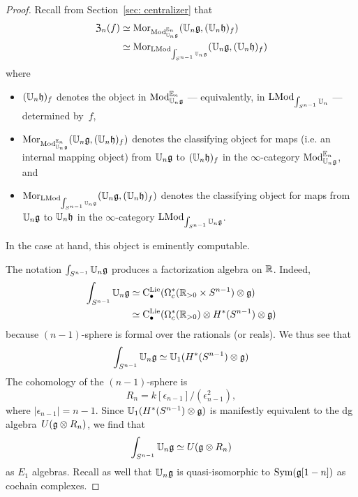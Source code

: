 \documentclass[11pt]{amsart}
\numberwithin{equation}{section}
\begin{document}
\begin{proof}
Recall from Section~\ref{sec: centralizer} that 
\begin{align*}
{\frak Z}_n(f) &\simeq {{\rm Mor}}_{{\rm Mod}^{\mathbb E_n}_{\mathbb U_n\mathfrak g}}(\mathbb U_n \mathfrak g, (\mathbb U_n \mathfrak h)_f) \\
&\simeq {\rm Mor}_{{\rm LMod}_{\int_{S^{n-1}} \mathbb U_n\mathfrak g}}(\mathbb U_n \mathfrak g, (\mathbb U_n \mathfrak h)_f)
\end{align*}
where 
\begin{itemize}
\item $(\mathbb U_n \mathfrak h)_f$ denotes the object in ${\rm Mod}^{\mathbb E_n}_{\mathbb U_n\mathfrak g}$ --- equivalently, in ${\rm LMod}_{\int_{S^{n-1}}\mathbb U_n}$ --- determined by~$f$, 
\item ${\rm Mor}_{{\rm Mod}^{\mathbb E_n}_{\mathbb U_n\mathfrak g}}(\mathbb U_n \mathfrak g, (\mathbb U_n \mathfrak h)_f)$ denotes the classifying object for maps (i.e. an internal mapping object) from $\mathbb U_n\mathfrak g$ to $(\mathbb U_n \mathfrak h)_f$ in the $\infty$-category ${\rm Mod}^{\mathbb E_n}_{\mathbb U_n\mathfrak g}$, and
\item ${\rm Mor}_{{\rm LMod}_{\int_{S^{n-1}} \mathbb U_n\mathfrak g}} (\mathbb U_n \mathfrak g, (\mathbb U_n \mathfrak h)_f)$ denotes the classifying object for maps from ${\mathbb U_n\mathfrak g}$ to $\mathbb U_n \mathfrak h$ in the $\infty$-category ${\rm LMod}_{\int_{S^{n-1}}\mathbb U_n\mathfrak g}$. 
\end{itemize}
In the case at hand, this object is eminently computable.

The notation $\int_{S^{n-1}}\mathbb U_n\mathfrak g$ produces a factorization algebra on $\mathbb R$.
Indeed,
\begin{align*}
\int_{S^{n-1}}\mathbb U_n\mathfrak g 
&\simeq {\rm C}^{\rm Lie}_\bullet(\Omega^*_c(\mathbb R_{> 0} \times S^{n-1}) \otimes \mathfrak g)\\
&\simeq {\rm C}^{\rm Lie}_\bullet(\Omega^*_c(\mathbb R_{> 0}) \otimes H^*(S^{n-1}) \otimes \mathfrak g)
\end{align*}
because $(n-1)$-sphere is formal over the rationals (or reals). 
We thus see that 
\[
\int_{S^{n-1}}\mathbb U_n\mathfrak g \simeq \mathbb U_1 (H^*(S^{n-1}) \otimes \mathfrak g)
\]
The cohomology of the $(n-1)$-sphere is 
\[
R_n = k[\epsilon_{n-1}]/(\epsilon_{n-1}^2),
\] 
where $|\epsilon_{n-1}| = n-1$.
Since $\mathbb U_1 (H^*(S^{n-1}) \otimes \mathfrak g)$ is manifestly equivalent to the dg algebra~$U(\mathfrak g \otimes R_n)$,
we find that 
\[
\int_{S^{n-1}}\mathbb U_n\mathfrak g \simeq U(\mathfrak g \otimes R_n)
\]
as $E_1$ algebras.
Recall as well that $\mathbb U_n \mathfrak g$ is quasi-isomorphic to ${\rm Sym}(\mathfrak g[1-n])$ as cochain complexes.


\end{proof}
\end{document}
